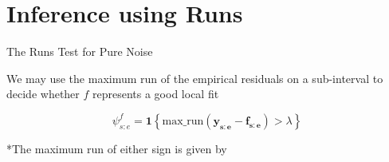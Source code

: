 \documentclass{beamer}
\begin{document}
\section{Inference using Runs}

\begin{frame}
\tableofcontents[currentsection]
\end{frame}

\begin{frame}{The Runs Test for Pure Noise}

\begin{exampleblock}{}
We may use the maximum run of the empirical residuals on a sub-interval to decide whether $f$ represents a good local fit

\begin{equation*}
	\psi_{s:e}^f = \mathbf{1} \left \{ \text{max\_run} (\mathbf{y_{s:e} - f_{s:e}}) > \lambda \right \}
	\label{equation: local runs test}
\end{equation*}
\end{exampleblock}

\bigskip

*The maximum run of either sign is given by

\bigskip 




\end{frame}
\end{document}
